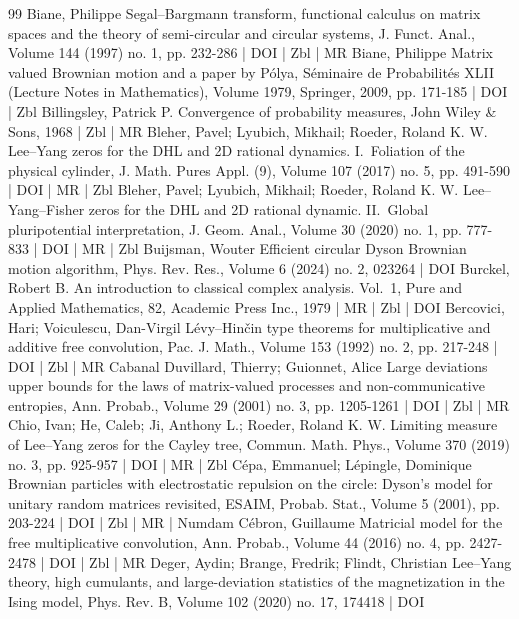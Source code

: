 \begin{thebibliography}{99}
Biane, Philippe Segal–Bargmann transform, functional calculus on matrix spaces and the theory of semi-circular and circular systems, J. Funct. Anal., Volume 144 (1997) no. 1, pp. 232-286 | DOI | Zbl | MR
Biane, Philippe Matrix valued Brownian motion and a paper by Pólya, Séminaire de Probabilités XLII (Lecture Notes in Mathematics), Volume 1979, Springer, 2009, pp. 171-185 | DOI | Zbl
Billingsley, Patrick P. Convergence of probability measures, John Wiley \& Sons, 1968 | Zbl | MR
Bleher, Pavel; Lyubich, Mikhail; Roeder, Roland K. W. Lee–Yang zeros for the DHL and 2D rational dynamics. I. Foliation of the physical cylinder, J. Math. Pures Appl. (9), Volume 107 (2017) no. 5, pp. 491-590 | DOI | MR | Zbl
Bleher, Pavel; Lyubich, Mikhail; Roeder, Roland K. W. Lee–Yang–Fisher zeros for the DHL and 2D rational dynamic. II. Global pluripotential interpretation, J. Geom. Anal., Volume 30 (2020) no. 1, pp. 777-833 | DOI | MR | Zbl
Buijsman, Wouter Efficient circular Dyson Brownian motion algorithm, Phys. Rev. Res., Volume 6 (2024) no. 2, 023264 | DOI
Burckel, Robert B. An introduction to classical complex analysis. Vol. 1, Pure and Applied Mathematics, 82, Academic Press Inc., 1979 | MR | Zbl | DOI
Bercovici, Hari; Voiculescu, Dan-Virgil Lévy–Hinčin type theorems for multiplicative and additive free convolution, Pac. J. Math., Volume 153 (1992) no. 2, pp. 217-248 | DOI | Zbl | MR
Cabanal Duvillard, Thierry; Guionnet, Alice Large deviations upper bounds for the laws of matrix-valued processes and non-communicative entropies, Ann. Probab., Volume 29 (2001) no. 3, pp. 1205-1261 | DOI | Zbl | MR
Chio, Ivan; He, Caleb; Ji, Anthony L.; Roeder, Roland K. W. Limiting measure of Lee–Yang zeros for the Cayley tree, Commun. Math. Phys., Volume 370 (2019) no. 3, pp. 925-957 | DOI | MR | Zbl
Cépa, Emmanuel; Lépingle, Dominique Brownian particles with electrostatic repulsion on the circle: Dyson’s model for unitary random matrices revisited, ESAIM, Probab. Stat., Volume 5 (2001), pp. 203-224 | DOI | Zbl | MR | Numdam
Cébron, Guillaume Matricial model for the free multiplicative convolution, Ann. Probab., Volume 44 (2016) no. 4, pp. 2427-2478 | DOI | Zbl | MR
Deger, Aydin; Brange, Fredrik; Flindt, Christian Lee–Yang theory, high cumulants, and large-deviation statistics of the magnetization in the Ising model, Phys. Rev. B, Volume 102 (2020) no. 17, 174418 | DOI

\end{thebibliography}

